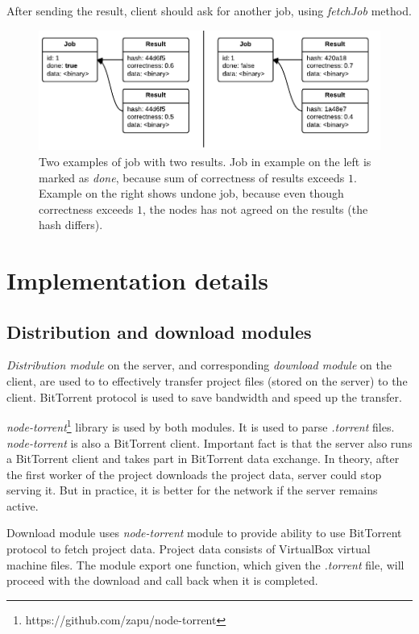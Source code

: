 After sending the result, client should ask for another job, using \emph{fetchJob} method.

\begin{figure}
\centering
\includegraphics{diagrams/SendResultsExample.pdf}
\caption{Two examples of job with two results. Job in example on the left is marked as \emph{done}, because sum of correctness of results exceeds $1$. Example on the right shows undone job, because even though correctness exceeds $1$, the nodes has not agreed on the results (the hash differs).}
\label{f:sendresultsex}
\end{figure}

\section{Implementation details}
\label{s:impldet}

\subsection{Distribution and download modules}

\emph{Distribution module} on the server, and corresponding \emph{download module} on the client, are used to to effectively transfer project files (stored on the server) to the client. BitTorrent protocol is used to save bandwidth and speed up the transfer.

\emph{node-torrent}\footnote{https://github.com/zapu/node-torrent} library is used by both modules. It is used to parse \emph{.torrent} files. \emph{node-torrent} is also a BitTorrent client. Important fact is that the server also runs a BitTorrent client and takes part in BitTorrent data exchange. In theory, after the first worker of the project downloads the project data, server could stop serving it. But in practice, it is better for the network if the server remains active.

Download module uses \emph{node-torrent} module to provide ability to use BitTorrent protocol to fetch project data. Project data consists of VirtualBox virtual machine files. The module export one function, which given the \emph{.torrent} file, will proceed with the download and call back when it is completed.

